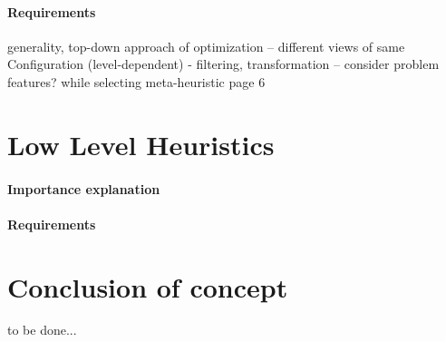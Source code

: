 \paragraph{Requirements} generality, top-down approach of optimization
-- different views of same Configuration (level-dependent) - filtering, transformation
-- consider problem features? while selecting meta-heuristic \cite{surv:kerschke2019automated} page 6


\section{Low Level Heuristics}\label{concept:llh}
\paragraph{Importance explanation}
\paragraph{Requirements}


\section{Conclusion of concept}
to be done...
